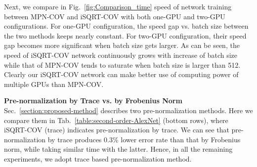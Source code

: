 \documentclass[10pt,twocolumn,letterpaper]{article}
\begin{document}
Next, we compare in  Fig.~\ref{fig:Comparison_time} speed  of network training between MPN-COV and iSQRT-COV with both one-GPU and two-GPU configurations. For one-GPU configuration, the speed gap vs. batch size between the two methods keeps nearly constant. For two-GPU configuration, their speed gap becomes more significant when  batch size gets larger. As can be seen, the  speed of iSQRT-COV network continuously grows with increase of batch size while that of MPN-COV tends to saturate when batch size is larger than 512. Clearly our iSQRT-COV network can make better use of computing power of multiple GPUs than MPN-COV.


\vspace{4pt}\noindent\textbf{Pre-normalization by Trace vs. by Frobenius Norm}\quad 
Sec.~\ref{section:proposed-method} describes two pre-normalization methods. Here we compare them in Tab.~\ref{table:second-order-AlexNet} (bottom rows), where iSQRT-COV (trace) indicates pre-normalization by trace. We can see that pre-normalization by trace produces 0.3\% lower error rate than that by Frobenius norm, while taking similar time with the latter. Hence, in all the remaining experiments, we adopt trace based pre-normalization method.
\end{document}
